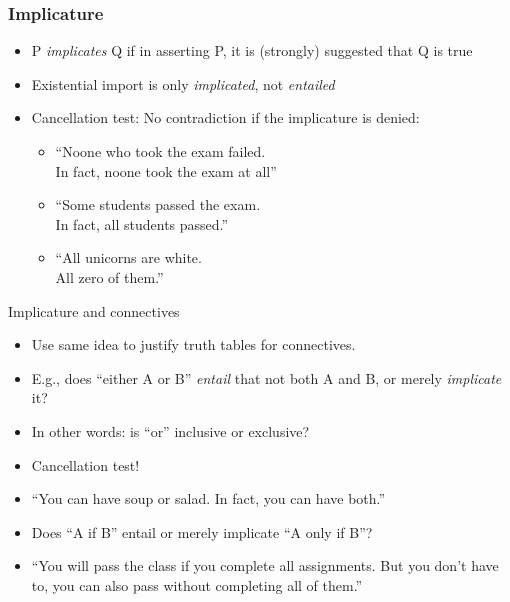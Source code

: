   \begin{frame}
  \frametitle{Implicature}

  \begin{itemize}[<+->]
  \item P \emph{implicates} Q if in asserting P, it is (strongly) suggested that Q is true
  \item Existential import is only \emph{implicated}, not \emph{entailed}
  \item Cancellation test: No contradiction if the implicature is denied:
  \begin{itemize}
  \item ``Noone who took the exam failed.\\
  In fact, noone took the exam at all''
  \item ``Some students passed the exam.\\
  In fact, all students passed.''
  \item ``All unicorns are white.\\
  All zero of them.''
  \end{itemize}
  \end{itemize}
\end{frame}

\begin{frame}{Implicature and connectives}
  \begin{itemize}
    \item Use same idea to justify truth tables for connectives.
    \item E.g., does ``either A or B'' \emph{entail} that not both A
    and B, or merely \emph{implicate} it?
    \item In other words: is ``or'' inclusive or exclusive?
    \item Cancellation test!
    \item ``You can have soup or salad. In fact, you can have both.''
    \item Does ``A if B'' entail or merely implicate ``A only if B''?
    \item ``You will pass the class if you complete all assignments.
    But you don't have to, you can also pass without completing all of
    them.''
  \end{itemize}
\end{frame}

\newhourlecture 


